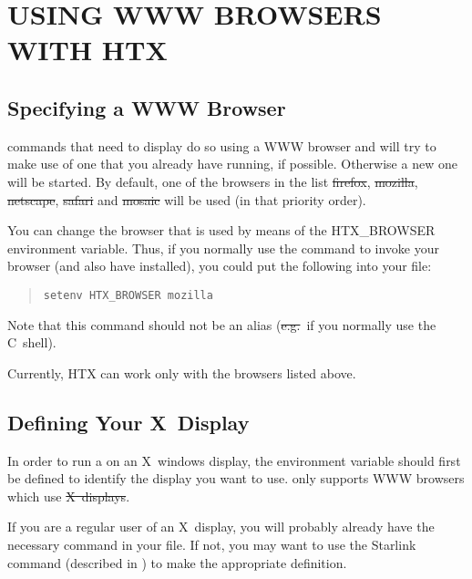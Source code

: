\section{\label{sect:usingwwwbrowsers}USING WWW BROWSERS WITH HTX}

\subsection{\label{sect:specifyingabrowser}Specifying a WWW Browser}

 commands that need to display
 do so using a WWW browser
and will try to make use of one that you already have running, if
possible. Otherwise a new one will be started. By default, one of the
browsers in the list \st{firefox}, \st{mozilla}, \st{netscape}, \st{safari}
and \st{mosaic} will be used (in that priority order).

You can change the browser that is used by means of the HTX\_BROWSER
environment variable. Thus, if you normally use the command  to
invoke your browser (and also have  installed), you could put the
following into your  file:

\begin{quote}
\begin{verbatim}
setenv HTX_BROWSER mozilla
\end{verbatim}
\end{quote}

Note that this command should not be an alias (\st{e.g.}\ if you
normally use the C~shell).

Currently, HTX can work only with the browsers listed above.

\subsection{Defining Your X~Display}

In order to run a  on an
X~windows display, the environment variable  should first
be defined to identify the display you want to
use.  only supports WWW browsers which use
\st{X~displays}.

If you are a regular user of an X~display, you will probably already
have the necessary command in your  file. If not, you may
want to use the Starlink  command (described in
) to make the appropriate definition.

